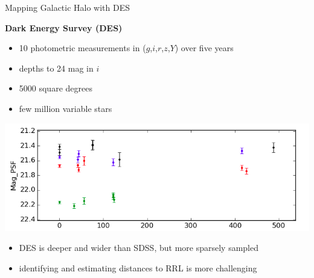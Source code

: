 \documentclass[12pt]{beamer}
\begin{document}


\begin{frame}{Mapping Galactic Halo with DES}

\textbf{Dark Energy Survey (DES)}
\begin{itemize}
\item 10 photometric measurements in ($g$,$i$,$r$,$z$,$Y$) over five years
\item depths to 24 mag in $i$
\item 5000 square degrees
\item few million variable stars
\end{itemize}

\vspace{.2in}

\begin{center}
  \includegraphics[scale=0.3]{figs/des2.png}
  \end{center}


\begin{itemize}
\item DES is deeper and wider than SDSS, but more sparsely sampled
\item identifying and estimating distances to RRL is more challenging
\end{itemize}


\end{frame}

\end{document}
